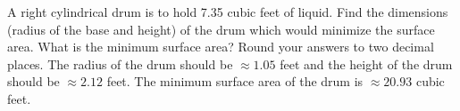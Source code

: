 {A right cylindrical drum is to hold 7.35 cubic feet of liquid.  Find the dimensions (radius of the base and height) of the drum which would minimize the surface area.  What is the minimum surface area?  Round your answers to two decimal places.}
{The radius of the drum should be $\approx 1.05$ feet and the height of the drum should be $\approx 2.12$ feet.  The minimum surface area of the drum is $\approx 20.93$ cubic feet.}